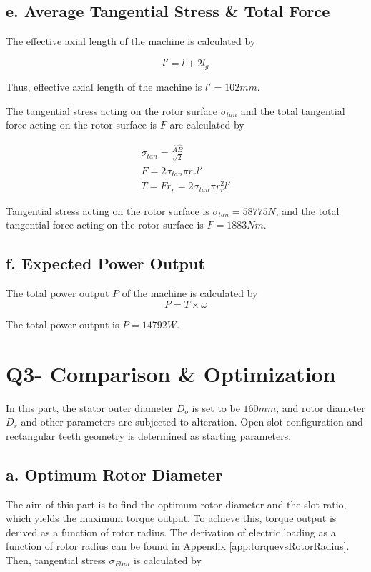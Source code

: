 \documentclass[a4paper, 11pt, titlepage]{article}
\begin{document}
\subsection{e. Average Tangential Stress \& Total Force}

The effective axial length of the machine is calculated by

\begin{equation}
	l'=l+2l_g
	\label{eq:effectiveAxialLength}
\end{equation}

Thus, effective axial length of the machine is $l'=102mm$.

The tangential stress acting on the rotor surface $\sigma_{tan}$ and the total tangential force acting on the rotor surface is $F$ are calculated by

\begin{eqnarray}
	\sigma_{tan} = \frac{\bar{A}\hat{B}}{\sqrt{2}} \\
	F = 2\sigma_{tan}\pi r_{r}l' \\
	T = Fr_{r}= 2\sigma_{tan}\pi r^2_{r}l'
	\label{eq:torqueOutput}
\end{eqnarray}

Tangential stress acting on the rotor surface is $\sigma_{tan}=58775N$, and the total tangential force acting on the rotor surface is $F=1883Nm$.

\subsection{f. Expected Power Output}

The total power output $P$ of the machine is calculated by
\begin{equation}
	P=T\times\omega
\end{equation}

The total power output is $P=14792W$.

\section{Q3- Comparison \& Optimization}

In this part, the stator outer diameter $D_o$ is set to be $160mm$, and rotor diameter $D_r$ and other parameters are subjected to alteration. Open slot configuration and rectangular teeth geometry is determined as starting parameters. 


\subsection{a. Optimum Rotor Diameter}
The aim of this part is to find the optimum rotor diameter and the slot ratio, which yields the maximum torque output. To achieve this, torque output is derived as a function of rotor radius. The derivation of electric loading as a function of rotor radius can be found in Appendix \ref{app:torquevsRotorRadius}. Then, tangential stress $\sigma_{Ftan}$ is calculated by
\end{document}
